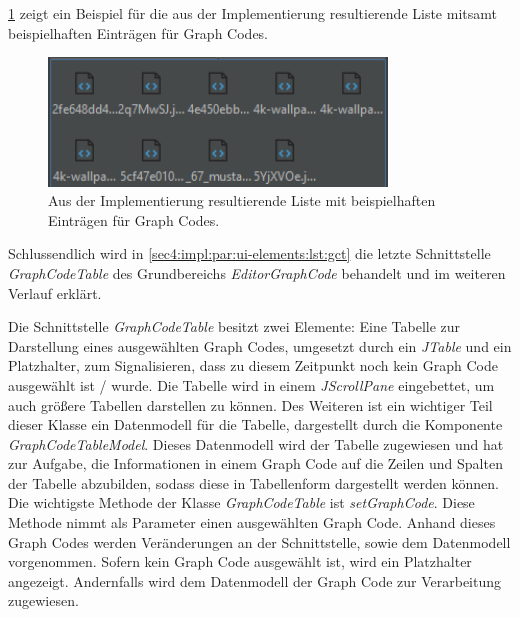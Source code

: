 \clearpage



\cref{sec4:impl:par:ui-elements:fig:wireframe-ui-5} zeigt ein Beispiel für die aus der Implementierung resultierende Liste mitsamt beispielhaften Einträgen für Graph Codes.

\begin{figure}[!ht]
  \includegraphics[width=9cm]{chapter/chapter_4/wireframe-impl-ui-5}
  \caption{Aus der Implementierung resultierende Liste mit beispielhaften Einträgen für Graph Codes.}
  \label{sec4:impl:par:ui-elements:fig:wireframe-ui-5}
\end{figure}

Schlussendlich wird in \cref{sec4:impl:par:ui-elements:lst:gct} die letzte Schnittstelle  \textit{GraphCodeTable} des Grundbereichs \textit{EditorGraphCode} behandelt und im weiteren Verlauf erklärt.



Die Schnittstelle \textit{GraphCodeTable} besitzt zwei Elemente: Eine Tabelle zur Darstellung eines ausgewählten Graph Codes, umgesetzt durch ein \textit{JTable} und ein Platzhalter, zum Signalisieren, dass zu diesem Zeitpunkt noch kein Graph Code ausgewählt ist / wurde.
Die Tabelle wird in einem \textit{JScrollPane} eingebettet, um auch größere Tabellen darstellen zu können.
Des Weiteren ist ein wichtiger Teil dieser Klasse ein Datenmodell für die Tabelle, dargestellt durch die Komponente \textit{GraphCodeTableModel}.
Dieses Datenmodell wird der Tabelle zugewiesen und hat zur Aufgabe, die Informationen in einem Graph Code auf die Zeilen und Spalten der Tabelle abzubilden, sodass diese in Tabellenform dargestellt werden können.
Die wichtigste Methode der Klasse \textit{GraphCodeTable} ist \textit{setGraphCode}.
Diese Methode nimmt als Parameter einen ausgewählten Graph Code.
Anhand dieses Graph Codes werden Veränderungen an der Schnittstelle, sowie dem Datenmodell vorgenommen.
Sofern kein Graph Code ausgewählt ist, wird ein Platzhalter angezeigt.
Andernfalls wird dem Datenmodell der Graph Code zur Verarbeitung zugewiesen.

